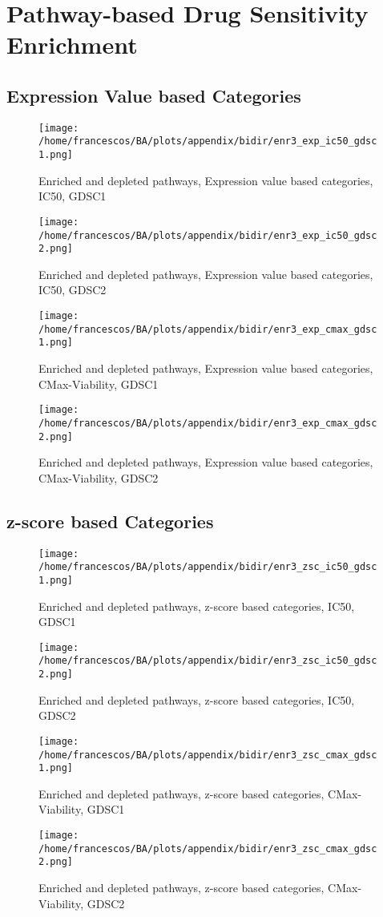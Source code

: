 \section{Pathway-based Drug Sensitivity Enrichment}

\subsection{Expression Value based Categories}
\begin{figure}[H]
    \centering
    \texttt{[image: /home/francescos/BA/plots/appendix/bidir/enr3\_exp\_ic50\_gdsc1.png]}
    \caption{Enriched and depleted pathways, Expression value based categories, IC50, GDSC1}
\end{figure}
\begin{figure}[H]
    \centering
    \texttt{[image: /home/francescos/BA/plots/appendix/bidir/enr3\_exp\_ic50\_gdsc2.png]}
    \caption{Enriched and depleted pathways, Expression value based categories, IC50, GDSC2}
\end{figure}
\begin{figure}[H]
    \centering
    \texttt{[image: /home/francescos/BA/plots/appendix/bidir/enr3\_exp\_cmax\_gdsc1.png]}
    \caption{Enriched and depleted pathways, Expression value based categories, CMax-Viability, GDSC1}
\end{figure}
\begin{figure}[H]
    \centering
    \texttt{[image: /home/francescos/BA/plots/appendix/bidir/enr3\_exp\_cmax\_gdsc2.png]}
    \caption{Enriched and depleted pathways, Expression value based categories, CMax-Viability, GDSC2}
\end{figure}

\subsection{z-score based Categories}
\begin{figure}[H]
    \centering
    \texttt{[image: /home/francescos/BA/plots/appendix/bidir/enr3\_zsc\_ic50\_gdsc1.png]}
    \caption{Enriched and depleted pathways, z-score based categories, IC50, GDSC1}
\end{figure}
\begin{figure}[H]
    \centering
    \texttt{[image: /home/francescos/BA/plots/appendix/bidir/enr3\_zsc\_ic50\_gdsc2.png]}
    \caption{Enriched and depleted pathways, z-score based categories, IC50, GDSC2}
\end{figure}
\begin{figure}[H]
    \centering
    \texttt{[image: /home/francescos/BA/plots/appendix/bidir/enr3\_zsc\_cmax\_gdsc1.png]}
    \caption{Enriched and depleted pathways, z-score based categories, CMax-Viability, GDSC1}
\end{figure}
\begin{figure}[H]
    \centering
    \texttt{[image: /home/francescos/BA/plots/appendix/bidir/enr3\_zsc\_cmax\_gdsc2.png]}
    \caption{Enriched and depleted pathways, z-score based categories, CMax-Viability, GDSC2}
\end{figure}

